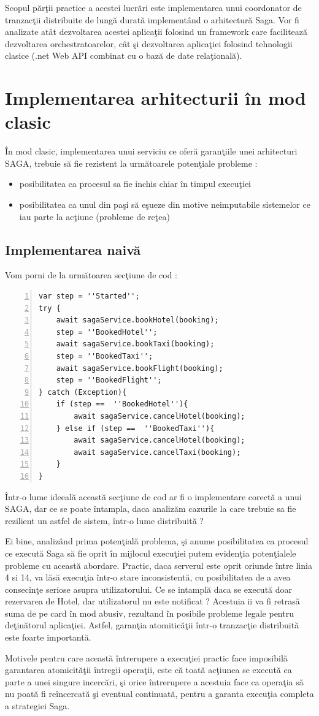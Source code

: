 \par Scopul părţii practice a acestei lucrări este implementarea unui coordonator de tranzacţii distribuite de lungă durată implementând o arhitectură Saga. Vor fi analizate atât dezvoltarea acestei aplicaţii folosind un framework care facilitează dezvoltarea orchestratoarelor, cât şi dezvoltarea aplicaţiei folosind tehnologii clasice (.net Web API  combinat cu o bază de date relaţională). 
\section{Implementarea arhitecturii în mod clasic}
\par În mod clasic, implementarea unui serviciu ce oferă garanţiile unei arhitecturi SAGA, trebuie să fie rezistent la următoarele potenţiale probleme :
\begin{itemize}
\item posibilitatea ca procesul sa fie inchis chiar în timpul execuţiei
\item posibilitatea ca unul din paşi să eşueze din motive neimputabile sistemelor ce iau parte la acţiune (probleme de reţea)
\end{itemize}
\subsection{Implementarea naivă}
Vom porni de la următoarea secţiune de cod : 
\begin{Verbatim}[numbers=left]
var step = ''Started'';
try {
	await sagaService.bookHotel(booking);
	step = ''BookedHotel'';
	await sagaService.bookTaxi(booking);
	step = ''BookedTaxi'';
	await sagaService.bookFlight(booking);
	step = ''BookedFlight'';
} catch (Exception){
	if (step ==  ''BookedHotel''){
		await sagaService.cancelHotel(booking);
	} else if (step ==  ''BookedTaxi''){
		await sagaService.cancelHotel(booking);
		await sagaService.cancelTaxi(booking);
	}
}
\end{Verbatim}
Într-o lume ideeală această secţiune de cod ar fi o implementare corectă a unui SAGA, dar ce se poate întampla, daca analizăm cazurile la care trebuie sa fie rezilient un astfel de sistem, într-o lume distribuită ? 
\par Ei bine, analizând prima potenţială problema, şi anume posibilitatea ca procesul ce execută Saga să fie oprit în mijlocul execuţiei putem evidenţia potenţialele probleme cu această abordare. Practic, daca serverul este oprit oriunde între linia 4 si 14, va lăsă execuţia într-o stare inconsistentă, cu posibilitatea de a avea consecinţe seriose asupra utilizatorului. Ce se intamplă daca se execută doar rezervarea de Hotel, dar utilizatorul nu este notificat ? Acestuia ii va fi retrasă suma de pe card în mod abusiv, rezultand în posibile probleme legale pentru deţinătorul aplicaţiei. Astfel, garanţia atomiticăţii într-o tranzacţie distribuită este foarte importantă. 
\par Motivele pentru care această întrerupere a execuţiei practic face imposibilă garantarea atomicităţii întregii operaţii, este că toată acţiunea se execută ca parte a unei singure incercări, şi orice întrerupere a acestuia face ca operaţia să nu poată fi reîncercată şi eventual continuată, pentru a garanta execuţia completa a strategiei Saga. 
